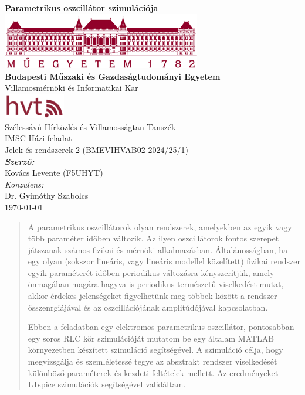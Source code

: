 \documentclass[12pt,a4paper]{article}
\begin{document}
\begin{titlepage}
    \centering
    \vspace*{\fill}
    \textbf{\Huge Parametrikus oszcillátor szimulációja}\\[2cm]
    \includegraphics[width=0.65\textwidth]{figures/bme_logo_nagy_bordo.jpg}\\[1cm]
    \textbf{\Large Budapesti Műszaki és Gazdaságtudományi Egyetem}\\[0.25cm]
    \Large Villamosmérnöki és Informatikai Kar\\[1cm]
    \includegraphics[width=0.2\textwidth]{figures/hvt-logo.png}\\[0.25cm]
    \Large Szélessávú Hírközlés és Villamosságtan Tanszék\\[2cm]
    \Large IMSC Házi feladat\\[0.25cm]
    \Large Jelek és rendszerek 2 (BMEVIHVAB02 2024/25/1)\\[1.5cm]
    \Large \textbf{\textit{Szerző:}}\\[0.25cm]
    \Large Kovács Levente (F5UHYT)\\[1cm]
    \small \textit{Konzulens:}\\[0.25cm]
    \small Dr. Gyimóthy Szabolcs\\[2cm]
    \Large \today
    \vspace*{\fill}
\end{titlepage}
\newpage

\tableofcontents
\newpage

\begin{abstract}
    A parametrikus oszcillátorok olyan rendszerek, amelyekben az egyik vagy több paraméter időben változik. Az ilyen oszcillátorok fontos szerepet játszanak
    számos fizikai és mérnöki alkalmazásban. Általánosságban, ha egy olyan (sokszor lineáris, vagy lineáris modellel közelített) fizikai rendszer egyik paraméterét
    időben periodikus változásra kényszerítjük, amely önmagában magára hagyva is periodikus természetű viselkedést mutat, akkor érdekes jelenségeket figyelhetünk meg
    többek között a rendszer összenrgiájával és az oszcillációjának amplitúdójával kapcsolatban.

    Ebben a feladatban egy elektromos parametrikus oszcillátor, pontosabban egy soros RLC kör szimulációját mutatom be egy általam MATLAB környezetben készített
    szimuláció segítségével. A szimuláció célja, hogy megvizsgálja és szemléletessé tegye az absztrakt rendszer viselkedését különböző paraméterek és kezdeti feltételek
    mellett. Az eredményeket LTspice szimulációk segítségével validáltam.
\end{abstract}
\end{document}
